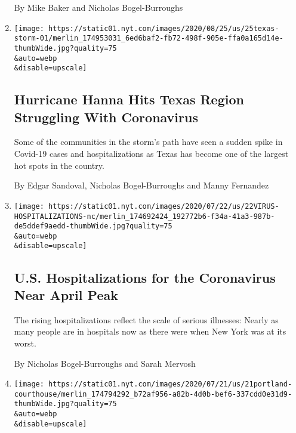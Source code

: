 \begin{enumerate}
  By Mike Baker and Nicholas Bogel-Burroughs
\item
  \href{/2020/07/25/us/hanna-storm-texas.html}{}

  \texttt{[image: https://static01.nyt.com/images/2020/08/25/us/25texas-storm-01/merlin\_174953031\_6ed6baf2-fb72-498f-905e-ffa0a165d14e-thumbWide.jpg?quality=75\\\&auto=webp\\\&disable=upscale]}

  \hypertarget{hurricane-hanna-hits-texas-region-struggling-with-coronavirus}{%
  \subsection{Hurricane Hanna Hits Texas Region Struggling With
  Coronavirus}\label{hurricane-hanna-hits-texas-region-struggling-with-coronavirus}}

  Some of the communities in the storm's path have seen a sudden spike
  in Covid-19 cases and hospitalizations as Texas has become one of the
  largest hot spots in the country.

  By Edgar Sandoval, Nicholas Bogel-Burroughs and Manny Fernandez
\item
  \href{/2020/07/22/us/coronavirus-hospitalizations-near-peak.html}{}

  \texttt{[image: https://static01.nyt.com/images/2020/07/22/us/22VIRUS-HOSPITALIZATIONS-nc/merlin\_174692424\_192772b6-f34a-41a3-987b-de5ddef9aedd-thumbWide.jpg?quality=75\\\&auto=webp\\\&disable=upscale]}

  \hypertarget{us-hospitalizations-for-the-coronavirus-near-april-peak}{%
  \subsection{U.S. Hospitalizations for the Coronavirus Near April
  Peak}\label{us-hospitalizations-for-the-coronavirus-near-april-peak}}

  The rising hospitalizations reflect the scale of serious illnesses:
  Nearly as many people are in hospitals now as there were when New York
  was at its worst.

  By Nicholas Bogel-Burroughs and Sarah Mervosh
\item
  \href{/2020/07/22/us/portland-protests-courthouse.html}{}

  \texttt{[image: https://static01.nyt.com/images/2020/07/21/us/21portland-courthouse/merlin\_174794292\_b72af956-a82b-4d0b-bef6-337cdd0e31d9-thumbWide.jpg?quality=75\\\&auto=webp\\\&disable=upscale]}

  \hypertarget{portland-clashes-converge-on-courthouse-named-for-an-antiwar-republican}{%
}
\end{enumerate}

